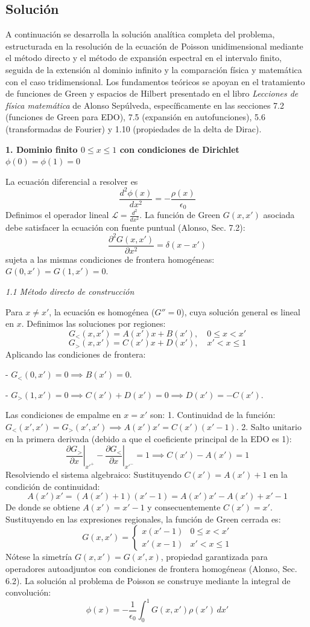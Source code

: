 \documentclass[a4paper]{article}
\begin{document}
\subsection{Solución}

A continuación se desarrolla la solución analítica completa del problema, estructurada en la resolución de la ecuación de Poisson unidimensional mediante el método directo y el método de expansión espectral en el intervalo finito, seguida de la extensión al dominio infinito y la comparación física y matemática con el caso tridimensional. Los fundamentos teóricos se apoyan en el tratamiento de funciones de Green y espacios de Hilbert presentado en el libro \textit{Lecciones de física matemática} de Alonso Sepúlveda, específicamente en las secciones 7.2 (funciones de Green para EDO), 7.5 (expansión en autofunciones), 5.6 (transformadas de Fourier) y 1.10 (propiedades de la delta de Dirac).

\textbf{1. Dominio finito $0 \le x \le 1$ con condiciones de Dirichlet $\phi(0)=\phi(1)=0$}

La ecuación diferencial a resolver es
$$ \frac{d^2\phi(x)}{dx^2} = -\frac{\rho(x)}{\epsilon_0} $$
Definimos el operador lineal $\mathscr{L} = \frac{d^2}{dx^2}$. La función de Green $G(x,x')$ asociada debe satisfacer la ecuación con fuente puntual (Alonso, Sec. 7.2):
$$ \frac{\partial^2 G(x,x')}{\partial x^2} = \delta(x-x') $$
sujeta a las mismas condiciones de frontera homogéneas: $G(0,x') = G(1,x') = 0$.

\textit{1.1 Método directo de construcción}

Para $x \neq x'$, la ecuación es homogénea ($G''=0$), cuya solución general es lineal en $x$. Definimos las soluciones por regiones:
$$ G_<(x,x') = A(x')x + B(x'), \quad 0 \le x < x' $$
$$ G_>(x,x') = C(x')x + D(x'), \quad x' < x \le 1 $$
Aplicando las condiciones de frontera:

- $G_<(0,x') = 0 \implies B(x') = 0$.

- $G_>(1,x') = 0 \implies C(x') + D(x') = 0 \implies D(x') = -C(x')$.

Las condiciones de empalme en $x=x'$ son:
1. Continuidad de la función: $G_<(x',x') = G_>(x',x') \implies A(x')x' = C(x')(x'-1)$.
2. Salto unitario en la primera derivada (debido a que el coeficiente principal de la EDO es 1): 
$$ \left.\frac{\partial G_>}{\partial x}\right|_{x'^+} - \left.\frac{\partial G_<}{\partial x}\right|_{x'^-} = 1 \implies C(x') - A(x') = 1 $$
Resolviendo el sistema algebraico:
Sustituyendo $C(x') = A(x') + 1$ en la condición de continuidad:
$$ A(x')x' = (A(x')+1)(x'-1) = A(x')x' - A(x') + x' - 1 $$
De donde se obtiene $A(x') = x' - 1$ y consecuentemente $C(x') = x'$.
Sustituyendo en las expresiones regionales, la función de Green cerrada es:
$$ G(x,x') = \begin{cases} x(x'-1) & 0 \le x < x' \\ x'(x-1) & x' < x \le 1 \end{cases} $$
Nótese la simetría $G(x,x') = G(x',x)$, propiedad garantizada para operadores autoadjuntos con condiciones de frontera homogéneas (Alonso, Sec. 6.2). La solución al problema de Poisson se construye mediante la integral de convolución:
$$ \phi(x) = -\frac{1}{\epsilon_0} \int_0^1 G(x,x') \rho(x') \, dx' $$
\end{document}
